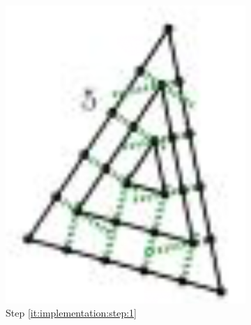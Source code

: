 \begin{figure}
\begin{subfigure}{0.18\columnwidth}
		\includegraphics[width=\textwidth]{content/img/implementation/tessellation_1.png}
		\caption{Step \ref{it:implementation:step:1}}
		\label{fig:implementation:step:1}
	\end{subfigure}	
	\begin{subfigure}{0.18\columnwidth}
		\centering

\end{subfigure}
\end{figure}
